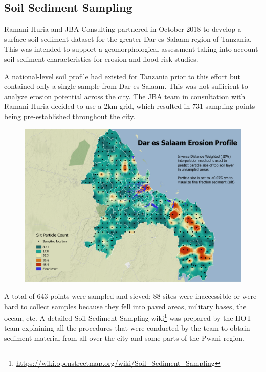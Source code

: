 \documentclass[a4paper,12pt,twoside]{article}
\begin{document}

\newpage
\subsection{Soil Sediment Sampling}

\begin{multicols}{2}
Ramani Huria and JBA Consulting partnered in October 2018 to develop a surface soil sediment dataset for the greater Dar es Salaam region of Tanzania. This was intended to support a geomorphological assessment taking into account soil sediment characteristics for erosion and flood risk studies.

A national-level soil profile had existed for Tanzania prior to this effort but contained only a single sample from Dar es Salaam. This was not sufficient to analyze erosion potential across the city. The JBA team in consultation with Ramani Huria decided to use a 2km grid, which resulted in 731 sampling points being pre-established throughout the city.
\end{multicols}

\begin{figure}[h]
    \centering
    \includegraphics[width=.7\textwidth]{images/erosion_Sep26_min.png}
    \label{fig:my_label}
\end{figure}

\begin{multicols}{2}
A total of 643 points were sampled and sieved; 88 sites were inaccessible or were hard to collect samples because they fell into paved areas, military bases, the ocean, etc. A detailed Soil Sediment Sampling wiki\footnote{\url{ https://wiki.openstreetmap.org/wiki/Soil_Sediment_Sampling}} was prepared by the HOT team explaining all the procedures that were conducted by the team to obtain sediment material from all over the city and some parts of the Pwani region.


\end{multicols}
\end{document}
\end{multicols}
\end{document}
